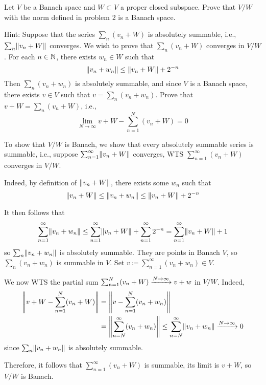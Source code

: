 \documentclass[a4paper, 10pt]{article}
\begin{document}
\begin{problem} 
    Let $V$ be a Banach space and $W \subset V$ a proper closed subspace. Prove that $V / W$ with the norm defined in problem 2 is a Banach space.

    Hint: Suppose that the series $\sum_{n} (v_n + W)$ is absolutely summable, i.e., $\sum_n \lVert v_n + W\rVert$ converges. We wish to prove that $\sum_{n} (v_n + W)$ converges in $V / W$. For each $n \in \mathbb{N}$, there exists $w_n \in W$ such that \begin{equation*}
    \lVert v_n + w_n\rVert \leq \lVert v_n + W\rVert + 2^{-n}
    \end{equation*}
    Then $\sum_{n} (v_n + w_n)$ is absolutely summable, and since $V$ is a Banach space, there exists $v \in V$ such that $v = \sum_{n} (v_n + w_n)$. Prove that $v + W = \sum_{n} (v_n + W)$, i.e., \begin{equation*}
    \lim_{N \to \infty} v + W - \sum_{n=1}^{N} (v_n + W) = 0
    \end{equation*}
\end{problem}
\begin{solution}
    To show that $V/W$ is Banach, we show that every absolutely summable series is summable, i.e., suppose $\sum_{n = 1}^\infty \lVert v_n + W\rVert$ converges, WTS $\sum_{n=1}^{\infty} (v_n + W)$ converges in $V / W$.

    Indeed, by definition of $\lVert v_n + W\rVert$, there exists some $w_n$ such that \begin{equation*}
    \lVert v_n + W\rVert \leq \lVert v_n + w_n\rVert \leq \lVert v_n + W\rVert + 2^{-n} 
    \end{equation*}

    It then follows that \begin{equation*}
    \sum_{n =1}^{\infty} \lVert v_n + w_n\rVert \leq \sum_{n=1}^{\infty} \lVert v_n + W\rVert + \sum_{n=1}^{\infty} 2^{-n}  = \sum_{n=1}^{\infty} \lVert v_n + W\rVert + 1
    \end{equation*}
    so $\sum_{n} \lVert v_n + w_n\rVert$ is absolutely summable. They are points in Banach $V$, so $\sum_{n} (v_n + w_n)$ is summable in $V$. Set $v \coloneqq \sum_{n=1}^{\infty} (v_n + w_n) \in V$.

    We now WTS the partial sum $\sum_{n=1}^{N} (v_n + W) \xrightarrow{N \to \infty} v + w$ in $V / W$. Indeed, \begin{align*}
    \norm*{v + W - \sum_{n=1}^{N} (v_n + W)} &= \norm*{v - \sum_{n=1}^{N} (v_n + w_n)} \\
    &= \norm*{\sum_{n = N}^{\infty} (v_n + w_n)} \leq \sum_{n=N}^{\infty} \norm*{v_n + w_n} \cvgg{N \to \infty} 0
    \end{align*}
    since $\sum_{n} \lVert v_n + w_n\rVert$ is absolutely summable.

    Therefore, it follows that $\sum_{n = 1}^{\infty} (v_n + W)$ is summable, its limit is $v + W$, so $V/W$ is Banach.
\end{solution}
\end{document}
